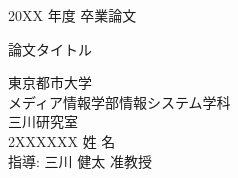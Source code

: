 
\begin{center}

    {\Large 20XX 年度 卒業論文}
    \vspace{3cm}

    {\LARGE 論文タイトル}
    \vspace{5cm}

    \begin{flushright}
        {\large 東京都市大学} \\
        {\large メディア情報学部情報システム学科} \\
        {\large 三川研究室} \\
        {\large 2XXXXXX 姓 名} \\
        {\large 指導: 三川 健太 准教授} \\
    \end{flushright}

\end{center}
